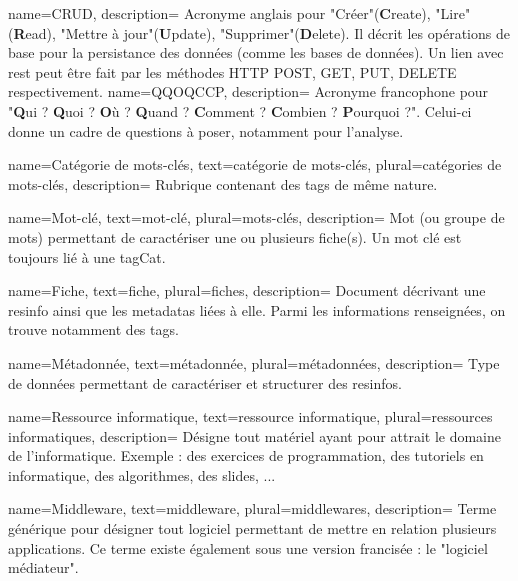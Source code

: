 {
    name={CRUD},
    description={
        Acronyme anglais pour "Créer"(\textbf{C}reate), "Lire" (\textbf{R}ead), "Mettre à jour"(\textbf{U}pdate), "Supprimer"(\textbf{D}elete). Il décrit les opérations de base pour la persistance des données (comme les bases de données). Un lien avec \Gls{rest} peut être fait par les méthodes HTTP POST, GET, PUT, DELETE respectivement.
    }
}
{
    name={QQOQCCP},
    description={
        Acronyme francophone pour "\textbf{Q}ui ? \textbf{Q}uoi ? \textbf{O}ù ? \textbf{Q}uand ? \textbf{C}omment ? \textbf{C}ombien ? \textbf{P}ourquoi ?". Celui-ci donne un cadre de questions à poser, notamment pour l'analyse.
    }
}

{
    name={Catégorie de mots-clés},
    text={catégorie de mots-clés},
    plural={catégories de mots-clés},
    description={
        Rubrique contenant des \glspl{tag} de même nature. 
    }
}

{
    name={Mot-clé},
    text={mot-clé},
    plural={mots-clés},
    description={
        Mot (ou groupe de mots) permettant de caractériser une ou plusieurs \gls{fiche}(s).
        Un mot clé est toujours lié à une \gls{tagCat}.
    }
}

{
    name={Fiche},
    text={fiche},
    plural={fiches},
    description={
        Document décrivant une \gls{resinfo} ainsi que les \glspl{metadata} liées à elle. Parmi les informations renseignées, on trouve notamment des \glspl{tag}.
    }
}

{
    name={Métadonnée},
    text={métadonnée},
    plural={métadonnées},
    description={
        Type de données permettant de caractériser et structurer des \glspl{resinfo}.
    }
}

{
    name={Ressource informatique},
    text={ressource informatique},
    plural={ressources informatiques},
    description={
        Désigne tout matériel ayant pour attrait le domaine de l'informatique. Exemple : des exercices de programmation, des tutoriels en informatique, des algorithmes, des slides, ...
    }
}

{
    name={Middleware},
    text={middleware},
    plural={middlewares},
    description={
        Terme générique pour désigner tout logiciel permettant de mettre en relation plusieurs applications.
        Ce terme existe également sous une version francisée : le "logiciel médiateur".
    }
}

